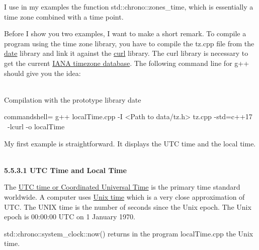 I use in my examples the function std::chrono::zones\_time, which is essentially a time zone combined with a time point.

\begin{tcolorbox}[breakable,enhanced jigsaw,colback=blue!5!white,colframe=blue!75!black,title={Compilation of the examples}]
	
Before I show you two examples, I want to make a short remark. To compile a program using the time zone library, you have to compile the tz.cpp file from the \href{https://github.com/HowardHinnant/date}{date} library and link it against the \href{https://curl.se/}{curl} library. The curl library is necessary to get the current \href{https://www.iana.org/timezones}{IANA timezone database}. The following command line for g++ should give you the idea:

\hspace*{\fill} \\ %
\noindent
Compilation with the prototype library date
\begin{tcblisting}{commandshell={}}
g++ localTime.cpp -I <Path to data/tz.h> tz.cpp -std=c++17 \
  -lcurl -o localTime
\end{tcblisting}

\end{tcolorbox}

My first example is straightforward. It displays the UTC time and the local time.

\hspace*{\fill} \\ %
\noindent
\textbf{5.5.3.1\hspace{0.2cm} UTC Time and Local Time}

The \href{https://en.wikipedia.org/wiki/Coordinated_Universal_Time}{UTC time or Coordinated Universal Time} is the primary time standard worldwide. A computer uses \href{https://en.wikipedia.org/wiki/Unix_time}{Unix time} which is a very close approximation of UTC. The UNIX time is the number of seconds since the Unix epoch. The Unix epoch is 00:00:00 UTC on 1 January 1970.

std::chrono::system\_clock::now() returns in the program localTime.cpp the Unix time.

